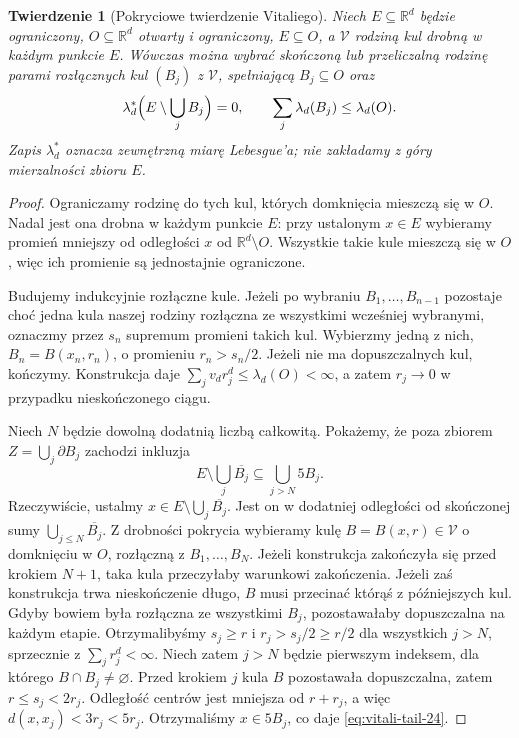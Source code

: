 \documentclass[11pt,a4paper,oneside]{book}
\numberwithin{equation}{chapter}
\theoremstyle{plain}
\newtheorem{twierdzenie}{Twierdzenie}[chapter]
\theoremstyle{definition}
\theoremstyle{remark}
\begin{document}
\begin{twierdzenie}[Pokryciowe twierdzenie Vitaliego]
\label{thm:vitali-cover-24}
Niech $E\subseteq\mathbb R^d$ będzie ograniczony,
$O\subseteq\mathbb R^d$ otwarty i ograniczony, $E\subseteq O$,
a $\mathcal V$ rodziną kul drobną w każdym punkcie $E$.
Wówczas można wybrać skończoną lub przeliczalną rodzinę
parami rozłącznych kul $(B_j)$ z $\mathcal V$, spełniającą
$B_j\subseteq O$ oraz
\[
 \lambda_d^*\Bigl(E\setminus\bigcup_jB_j\Bigr)=0,
 \qquad \sum_j\lambda_d(B_j)\le\lambda_d(O).
\]
Zapis $\lambda_d^*$ oznacza zewnętrzną miarę Lebesgue'a;
nie zakładamy z góry mierzalności zbioru $E$.
\end{twierdzenie}
\begin{proof}
Ograniczamy rodzinę do tych kul, których domknięcia mieszczą
się w $O$. Nadal jest ona drobna w każdym punkcie $E$:
przy ustalonym $x\in E$ wybieramy promień mniejszy od
odległości $x$ od $\mathbb R^d\setminus O$.
Wszystkie takie kule mieszczą się w $O$, więc ich promienie
są jednostajnie ograniczone.

Budujemy indukcyjnie rozłączne kule. Jeżeli po wybraniu
$B_1,\ldots,B_{n-1}$ pozostaje choć jedna kula naszej rodziny
rozłączna ze wszystkimi wcześniej wybranymi, oznaczmy przez
$s_n$ supremum promieni takich kul. Wybierzmy jedną z nich,
$B_n=B(x_n,r_n)$, o promieniu $r_n>s_n/2$. Jeżeli nie ma
dopuszczalnych kul, kończymy. Konstrukcja daje
$\sum_jv_dr_j^d\le\lambda_d(O)<\infty$, a zatem
$r_j\to0$ w przypadku nieskończonego ciągu.

Niech $N$ będzie dowolną dodatnią liczbą całkowitą.
Pokażemy, że poza zbiorem
$Z=\bigcup_j\partial B_j$ zachodzi inkluzja
\begin{equation}\label{eq:vitali-tail-24}
 E\setminus\bigcup_j\overline{B_j}
 \subseteq\bigcup_{j>N}5B_j.
\end{equation}
Rzeczywiście, ustalmy $x\in E\setminus\bigcup_j\overline{B_j}$.
Jest on w dodatniej odległości od skończonej sumy
$\bigcup_{j\le N}\overline{B_j}$. Z drobności pokrycia
wybieramy kulę $B=B(x,r)\in\mathcal V$ o domknięciu
w $O$, rozłączną z $B_1,\ldots,B_N$.
Jeżeli konstrukcja zakończyła się przed krokiem $N+1$,
taka kula przeczyłaby warunkowi zakończenia. Jeżeli zaś
konstrukcja trwa nieskończenie długo, $B$ musi przecinać
którąś z późniejszych kul. Gdyby bowiem była rozłączna
ze wszystkimi $B_j$, pozostawałaby dopuszczalna na
każdym etapie. Otrzymalibyśmy $s_j\ge r$ i
$r_j>s_j/2\ge r/2$ dla wszystkich $j>N$,
sprzecznie z $\sum_jr_j^d<\infty$.
Niech zatem $j>N$ będzie pierwszym indeksem, dla
którego $B\cap B_j\ne\varnothing$.
Przed krokiem $j$ kula $B$ pozostawała dopuszczalna,
zatem $r\le s_j<2r_j$. Odległość centrów jest mniejsza
od $r+r_j$, a więc $d(x,x_j)<3r_j<5r_j$.
Otrzymaliśmy $x\in5B_j$, co daje \eqref{eq:vitali-tail-24}.


\end{proof}
\end{document}

